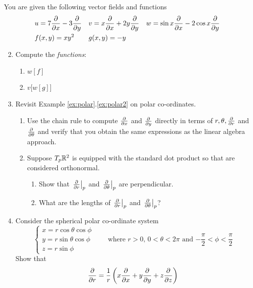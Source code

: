 \begin{exercises}
	\exstart You are given the following vector fields and functions
		\begin{align*}
			&u=7\frac{\partial }{\partial x}-3\frac{\partial }{\partial y}
			&&v=x\frac{\partial }{\partial x}+2y\frac{\partial }{\partial y}
			&&w=\sin x\frac{\partial }{\partial x}-2\cos x\frac{\partial }{\partial y}\\
			&f(x,y)=xy^2
			&&g(x,y)=-y
			&&
		\end{align*}
		
	\begin{enumerate}\setcounter{enumi}{1}
  	\item[] Compute the \emph{functions}:
  	\begin{enumerate}
    	\item {}\lstsp {}\lstsp $w[f]$
    	\setcounter{enumii}{3}
    	\item {}\lstsp {}\lstsp $v\bigl[w[g]\bigr]$
  	\end{enumerate}
  
  
	  \item Revisit Example \ref*{ex:polar}.\ref{ex:polar2} on polar co-ordinates.
	  \begin{enumerate}
	    \item Use the chain rule to compute $\frac{\partial }{\partial x}$ and $\frac{\partial }{\partial y}$ directly in terms of $r,\theta,\frac{\partial }{\partial r}$ and $\frac{\partial }{\partial \theta}$ and verify that you obtain the same expressions as the linear algebra approach.
	    \item Suppose $T_p\mathbb{R}^2$ is equipped with the standard dot product so that  are considered orthonormal.
	    \begin{enumerate}
	      \item Show that $\left.\frac{\partial }{\partial r}\right|_{p}$ and $\left.\frac{\partial }{\partial \theta}\right|_{p}$ are perpendicular.
	      \item What are the lengths of $\left.\frac{\partial }{\partial r}\right|_{p}$ and $\left.\frac{\partial }{\partial \theta}\right|_{p}$?
	  	\end{enumerate}
	  \end{enumerate}
  
  
	  \item\label{exs:spherical} Consider the spherical polar co-ordinate system
	  \[
	  	\begin{cases}
				x=r\cos\theta\cos\phi\\
	  		y=r\sin\theta\cos\phi\\
	  		z=r\sin\phi
	  	\end{cases}
	  	\qquad
	  	\text{where $r>0$, \ $0<\theta<2\pi$ and $-\frac\pi 2<\phi<\frac\pi 2$}
	  \]
	  Show that
	  \[
	  	\frac{\partial }{\partial r}=\frac 1r\left(x\frac{\partial }{\partial x}+y\frac{\partial }{\partial y}+z\frac{\partial }{\partial z}\right)
	  \]
	  

\end{enumerate}
\end{exercises}
